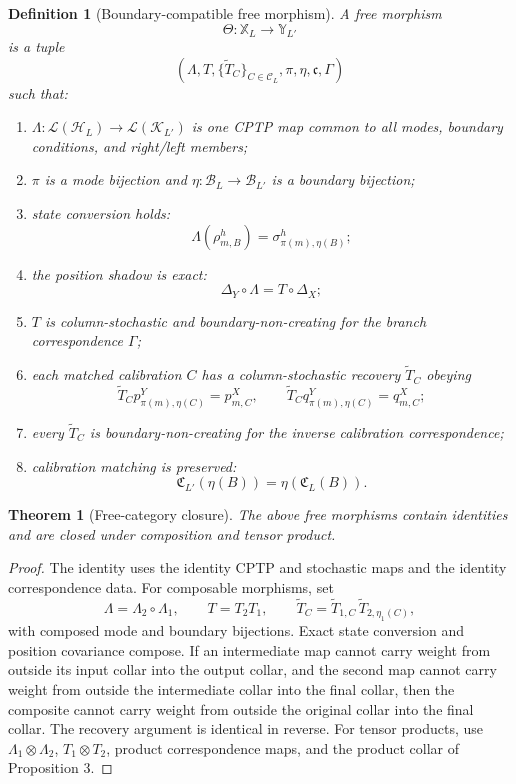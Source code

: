 \documentclass[11pt]{article}
\newtheorem{definition}{Definition}
\newtheorem{theorem}{Theorem}
\newcommand{\calB}{\mathcal B}
\newcommand{\calC}{\mathcal C}
\newcommand{\HH}{\mathcal H}
\begin{document}
\begin{definition}[Boundary-compatible free morphism]
A free morphism
\[
\Theta:\mathbb X_L\longrightarrow\mathbb Y_{L'}
\]
is a tuple
\[
(\Lambda,T,\{\widetilde T_C\}_{C\in\calC_L},\pi,\eta,\mathfrak c,\Gamma)
\]
such that:

\begin{enumerate}[leftmargin=1.8em]
\item \(\Lambda:\mathcal L(\HH_L)\to\mathcal L(\mathcal K_{L'})\) is one CPTP map common to all modes, boundary conditions, and right/left members;
\item \(\pi\) is a mode bijection and \(\eta:\calB_L\to\calB_{L'}\) is a boundary bijection;
\item state conversion holds:
\[
\Lambda(\rho_{m,B}^{h})
=
\sigma_{\pi(m),\eta(B)}^{h};
\]
\item the position shadow is exact:
\[
\Delta_Y\circ\Lambda
=
T\circ\Delta_X;
\]
\item \(T\) is column-stochastic and boundary-non-creating for the branch correspondence \(\Gamma\);
\item each matched calibration \(C\) has a column-stochastic recovery \(\widetilde T_C\) obeying
\[
\widetilde T_C p^Y_{\pi(m),\eta(C)}=p^X_{m,C},
\qquad
\widetilde T_C q^Y_{\pi(m),\eta(C)}=q^X_{m,C};
\]
\item every \(\widetilde T_C\) is boundary-non-creating for the inverse calibration correspondence;
\item calibration matching is preserved:
\[
\mathfrak C_{L'}(\eta(B))
=
\eta(\mathfrak C_L(B)).
\]
\end{enumerate}
\end{definition}

\begin{theorem}[Free-category closure]
The above free morphisms contain identities and are closed under composition and tensor product.
\end{theorem}

\begin{proof}
The identity uses the identity CPTP and stochastic maps and the identity correspondence data. For composable morphisms, set
\[
\Lambda=\Lambda_2\circ\Lambda_1,
\qquad
T=T_2T_1,
\qquad
\widetilde T_C
=
\widetilde T_{1,C}\,\widetilde T_{2,\eta_1(C)},
\]
with composed mode and boundary bijections. Exact state conversion and position covariance compose. If an intermediate map cannot carry weight from outside its input collar into the output collar, and the second map cannot carry weight from outside the intermediate collar into the final collar, then the composite cannot carry weight from outside the original collar into the final collar. The recovery argument is identical in reverse. For tensor products, use \(\Lambda_1\otimes\Lambda_2\), \(T_1\otimes T_2\), product correspondence maps, and the product collar of Proposition 3.
\end{proof}
\end{document}
